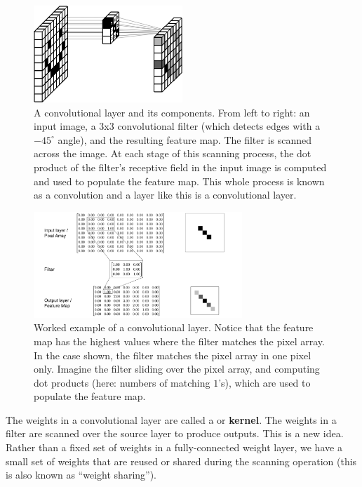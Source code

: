 \begin{figure}[h]
\centering
\includegraphics[width=0.5\textwidth]{images/happyConvolution.png}
\caption[Soraya Boza, adapting this image from User Cecbur, \url{https://commons.wikimedia.org/wiki/File:Convolutional_Neural_Network_NeuralNetworkFilter.gif}, with labels added by Jeff Yoshimi.]{A convolutional layer and its components. From left to right: an input image, a 3x3 convolutional filter (which detects edges with a $-45^\circ$ angle), and the resulting feature map. The filter is scanned across the image. At each stage of this scanning process, the dot product of the filter's receptive field in the input image is computed and used to populate the feature map. This whole process is known as a convolution and a layer like this is a convolutional layer.}
\label{cnn_filter}
\end{figure}

\begin{figure}[h]
\centering
\includegraphics[width=0.7\textwidth]{images/CNN_WorkedExample.png}
\caption[Jeff Yoshimi]{Worked example of a convolutional layer. Notice that the feature map has the highest values where the filter matches the pixel array. In the case shown, the filter matches the pixel array in one pixel only. Imagine the filter sliding over the pixel array, and computing dot products (here: numbers of matching $1$'s), which are used to populate the feature map.}
\label{cnn_workedExample}
\end{figure}

The weights in a convolutional layer are called a  or \textbf{kernel}. The weights in a filter are scanned over the source layer to produce outputs. This is a new idea. Rather than a fixed set of weights in a fully-connected weight layer, we have a small set of weights that are reused or shared during the scanning operation (this is also known as ``weight sharing'').

